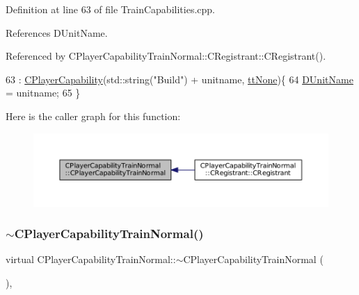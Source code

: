 Definition at line 63 of file Train\+Capabilities.\+cpp.



References D\+Unit\+Name.



Referenced by C\+Player\+Capability\+Train\+Normal\+::\+C\+Registrant\+::\+C\+Registrant().


\begin{DoxyCode}
63                                                                                     : 
      \hyperlink{classCPlayerCapability_a303de62aba5d3f65d9a8e013c64a96c1}{CPlayerCapability}(std::string(\textcolor{stringliteral}{"Build"}) + unitname, \hyperlink{classCPlayerCapability_a9d3450ed1532fd536bd6cbb1e2eef02fac78f0e806a6b0ead030d63c27c9ce929}{ttNone})\{
64     \hyperlink{classCPlayerCapabilityTrainNormal_aed40686355e78c151910e23ea2d9d32c}{DUnitName} = unitname;
65 \}
\end{DoxyCode}
Here is the caller graph for this function\+:\nopagebreak
\begin{figure}[H]
\begin{center}
\leavevmode
\includegraphics[width=350pt]{classCPlayerCapabilityTrainNormal_a80b62a5131937c8230bf6229626dc53c_icgraph}
\end{center}
\end{figure}
\hypertarget{classCPlayerCapabilityTrainNormal_a1cc40f48e17f7e7fab3af09a85b4eb0f}{}\label{classCPlayerCapabilityTrainNormal_a1cc40f48e17f7e7fab3af09a85b4eb0f} 
\subsubsection{\texorpdfstring{$\sim$\+C\+Player\+Capability\+Train\+Normal()}{~CPlayerCapabilityTrainNormal()}}
{\footnotesize\ttfamily virtual C\+Player\+Capability\+Train\+Normal\+::$\sim$\+C\+Player\+Capability\+Train\+Normal (\begin{DoxyParamCaption}{ }\end{DoxyParamCaption})\hspace{0.3cm}{\ttfamily [inline]}, {\ttfamily [virtual]}}



